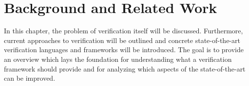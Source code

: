 \chapter{Background and Related Work} %
\label{ch:background}

In this chapter, the problem of verification itself will be discussed. Furthermore, current approaches to
verification will be outlined and concrete state-of-the-art verification languages and frameworks will be introduced.
The goal is to provide an overview which lays the foundation for understanding what a verification framework should
provide and for analyzing which aspects of the state-of-the-art can be improved. 

